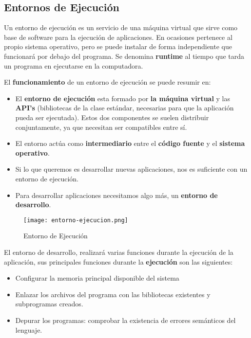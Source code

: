 \subsection{Entornos de Ejecución}
Un entorno de ejecución es un servicio de una máquina virtual que sirve como base de software para la ejecución de aplicaciones. En ocasiones pertenece al propio sistema operativo, pero se puede instalar de forma independiente que funcionará por debajo del programa. Se denomina \textbf{runtime} al tiempo que tarda un programa en ejecutarse en la computadora.

El \textbf{funcionamiento} de un entorno de ejecución se puede resumir en:

\begin{itemize}
    \item El \textbf{entorno de ejecución} esta formado por \textbf{la máquina virtual} y las \textbf{API's} (bibliotecas de la clase estándar, necesarias para que la aplicación pueda ser ejecutada). Estos dos componentes se suelen distribuir conjuntamente, ya que necesitan ser compatibles entre sí.
    \item El entorno actúa como \textbf{intermediario} entre el \textbf{código fuente} y el \textbf{sistema operativo}.
    \item Si lo que queremos es desarrollar nuevas aplicaciones, nos es suficiente con un entorno de ejecución.
    \item Para desarrollar aplicaciones necesitamos algo más, un \textbf{entorno de desarrollo}.
\end{itemize}

\begin{figure}[ht]
    \centering
    \texttt{[image: entorno-ejecucion.png]}
    \caption{Entorno de Ejecución}
\end{figure}

El entorno de desarrollo, realizará varias funciones durante la ejecución de la aplicación, sus principales funciones durante la \textbf{ejecución} son las siguientes:

\begin{itemize}
    \item Configurar la memoria principal disponible del sistema
    \item Enlazar los archivos del programa con las bibliotecas existentes y subprogramas creados.
    \item Depurar los programas: comprobar la existencia de errores semánticos del lenguaje.
\end{itemize}

